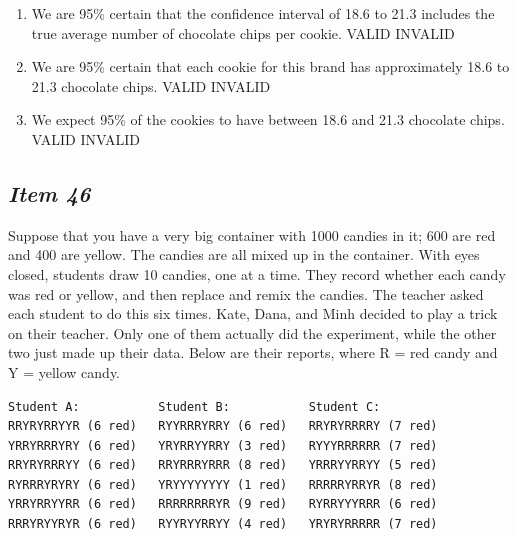\begin{enumerate} [leftmargin=1cm, itemsep=.2em]


\item We are 95\% certain that the confidence interval of 18.6 to 21.3 includes the true average number of chocolate chips per cookie. VALID INVALID


\item We are 95\% certain that each cookie for this brand has approximately 18.6 to 21.3 chocolate chips. VALID INVALID


\item We expect 95\% of the cookies to have between 18.6 and 21.3 chocolate chips. VALID INVALID


\end{enumerate}





\subsection{\textbf{\textit{Item 46}}}


Suppose that you have a very big container with 1000 candies in it; 600 are red and 400 are yellow. The candies are all mixed up in the container. With eyes closed, students draw 10 candies, one at a time. They record whether each candy was red or yellow, and then replace and remix the candies. The teacher asked each student to do this six times. Kate, Dana, and Minh decided to play a trick on their teacher. Only one of them actually did the experiment, while the other two just made up their data. Below are their reports, where R = red candy and Y = yellow candy.




\begin{verbatim}
Student A:           Student B:           Student C:
RRYRYRRYYR (6 red)   RYYRRRYRRY (6 red)   RRYRYRRRRY (7 red)
YRRYRRRYRY (6 red)   YRYRRYYRRY (3 red)   RYYYRRRRRR (7 red)
RRYRYRRRYY (6 red)   RRYRRRYRRR (8 red)   YRRRYYRRYY (5 red)
RYRRRYRYRY (6 red)   YRYYYYYYYY (1 red)   RRRRRYRRYR (8 red)
YRRYRRYYRR (6 red)   RRRRRRRRYR (9 red)   RYRRYYYRRR (6 red)
RRRYRYYRYR (6 red)   RYYRYYRRYY (4 red)   YRYRYRRRRR (7 red)
\end{verbatim}


